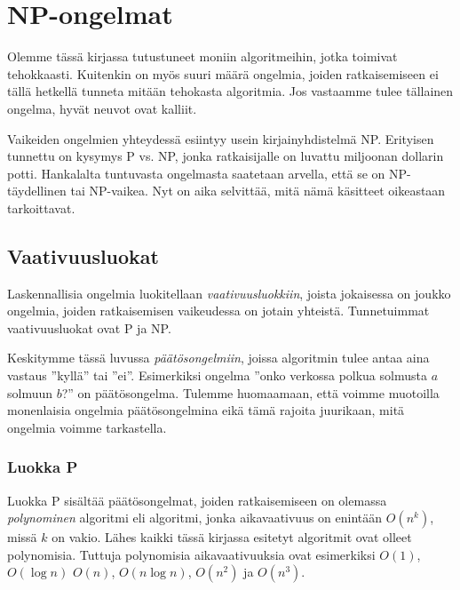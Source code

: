 \chapter{NP-ongelmat}


Olemme tässä kirjassa tutustuneet moniin algoritmeihin,
jotka toimivat tehokkaasti.
Kuitenkin on myös suuri määrä ongelmia, joiden ratkaisemiseen ei tällä
hetkellä tunneta mitään tehokasta algoritmia.
Jos vastaamme tulee tällainen ongelma, hyvät neuvot ovat kalliit.

Vaikeiden ongelmien yhteydessä esiintyy usein kirjainyhdistelmä NP.
Erityisen tunnettu on kysymys P vs. NP,
jonka ratkaisijalle on luvattu miljoonan dollarin potti.
Hankalalta tuntuvasta ongelmasta saatetaan arvella, että
se on NP-täydellinen tai NP-vaikea.
Nyt on aika selvittää, mitä nämä käsitteet oikeastaan tarkoittavat.

\section{Vaativuusluokat}


Laskennallisia ongelmia luokitellaan \emph{vaativuusluokkiin},
joista jokaisessa on joukko ongelmia,
joiden ratkaisemisen vaikeudessa on jotain yhteistä.
Tunnetuimmat vaativuusluokat ovat P ja NP.


Keskitymme tässä luvussa \emph{päätösongelmiin}, joissa algoritmin tulee
antaa aina vastaus ''kyllä'' tai ''ei''.
Esimerkiksi ongelma 
''onko verkossa polkua solmusta $a$ solmuun $b$?'' on päätösongelma.
Tulemme huomaamaan, että voimme muotoilla monenlaisia ongelmia
päätösongelmina eikä tämä rajoita juurikaan, mitä ongelmia voimme tarkastella.

\subsection{Luokka P}


Luokka P sisältää päätösongelmat, joiden ratkaisemiseen on
olemassa \emph{polynominen} algoritmi eli algoritmi, jonka aikavaativuus
on enintään $O(n^k)$, missä $k$ on vakio.
Lähes kaikki tässä kirjassa esitetyt algoritmit
ovat olleet polynomisia.
Tuttuja polynomisia aikavaativuuksia ovat esimerkiksi
$O(1)$, $O(\log n)$ $O(n)$, $O(n \log n)$, $O(n^2)$ ja $O(n^3)$.

